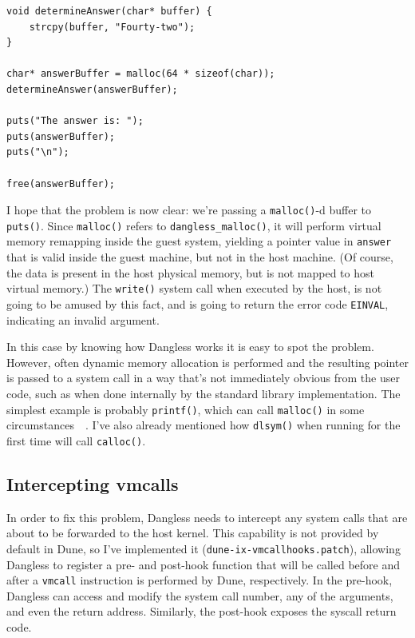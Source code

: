\begin{lstlisting}
void determineAnswer(char* buffer) {
	strcpy(buffer, "Fourty-two");
}

char* answerBuffer = malloc(64 * sizeof(char));
determineAnswer(answerBuffer);

puts("The answer is: ");
puts(answerBuffer);
puts("\n");

free(answerBuffer);
\end{lstlisting}

I hope that the problem is now clear: we're passing a \lstinline!malloc()!-d buffer to \lstinline!puts()!. Since \lstinline!malloc()! refers to \lstinline!dangless_malloc()!, it will perform virtual memory remapping inside the guest system, yielding a pointer value in \lstinline!answer! that is valid inside the guest machine, but not in the host machine. (Of course, the data is present in the host physical memory, but is not mapped to host virtual memory.) The \lstinline!write()! system call when executed by the host, is not going to be amused by this fact, and is going to return the error code \texttt{EINVAL}, indicating an invalid argument.

In this case by knowing how Dangless works it is easy to spot the problem. However, often dynamic memory allocation is performed and the resulting pointer is passed to a system call in a way that's not immediately obvious from the user code, such as when done internally by the standard library implementation. The simplest example is probably \lstinline!printf()!, which can call \lstinline!malloc()! in some circumstances~\cite{glibc-printf-malloc}~\cite{glibc-printf-malloc-vulnerability}. I've also already mentioned how \lstinline!dlsym()! when running for the first time will call \lstinline!calloc()!.

\subsection{Intercepting vmcalls}

In order to fix this problem, Dangless needs to intercept any system calls that are about to be forwarded to the host kernel. This capability is not provided by default in Dune, so I've implemented it (\texttt{dune-ix-vmcallhooks.patch}), allowing Dangless to register a pre- and post-hook function that will be called before and after a \lstinline!vmcall! instruction is performed by Dune, respectively. In the pre-hook, Dangless can access and modify the system call number, any of the arguments, and even the return address. Similarly, the post-hook exposes the syscall return code.

